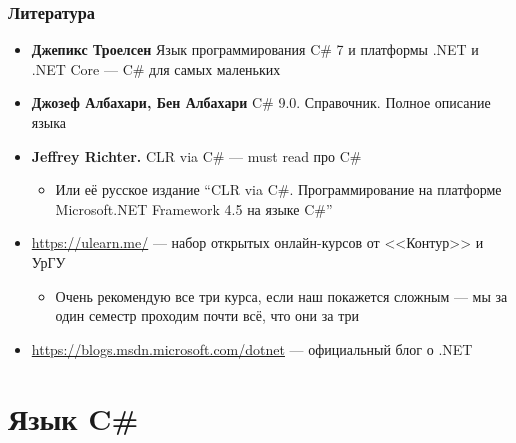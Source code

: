 \documentclass[xetex,mathserif,serif]{beamer}
\begin{document}
    \begin{frame}
    \frametitle{Литература}
        \begin{itemize}
            \item \textbf{Джепикс Троелсен} Язык программирования C\# 7 и платформы .NET и .NET Core --- C\# для самых маленьких
            \item \textbf{Джозеф Албахари, Бен Албахари} C\# 9.0. Справочник. Полное описание языка
            \item \textbf{Jeffrey Richter.} CLR via C\# --- must read про C\#
            \begin{itemize}
                \item Или её русское издание ``CLR via C\#. Программирование на платформе Microsoft.NET Framework 4.5 на языке C\#''
            \end{itemize}
            \item \url{https://ulearn.me/} --- набор открытых онлайн-курсов от <<Контур>> и УрГУ
            \begin{itemize}
                \item Очень рекомендую все три курса, если наш покажется сложным --- мы за один семестр проходим почти всё, что они за три
            \end{itemize}
            \item \url{https://blogs.msdn.microsoft.com/dotnet} --- официальный блог о .NET
        \end{itemize}
    \end{frame}

    \section{Язык C\#}
\end{document}
